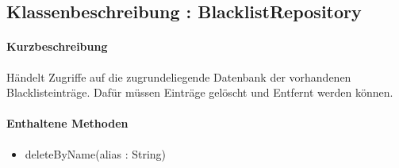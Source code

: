 \subsection{Klassenbeschreibung : BlacklistRepository}%
\paragraph*{Kurzbeschreibung}
Händelt Zugriffe auf die zugrundeliegende Datenbank der vorhandenen Blacklisteinträge.
Dafür müssen Einträge gelöscht und Entfernt werden können.
\paragraph*{Enthaltene Methoden}
\begin{itemize}
    \item deleteByName(alias : String)
\end{itemize}
